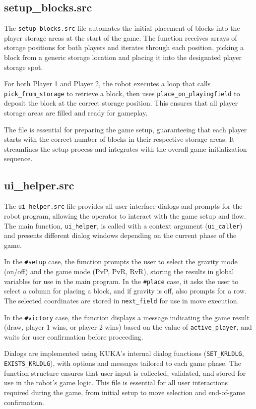 \documentclass{article}
\begin{document}
        \subsection{setup\_blocks.src}
            The \texttt{setup\_blocks.src} file automates the initial placement of blocks into the player storage areas at the start of the game. The function receives arrays of storage positions for both players and iterates through each position, picking a block from a generic storage location and placing it into the designated player storage spot.

            For both Player 1 and Player 2, the robot executes a loop that calls \texttt{pick\_from\_storage} to retrieve a block, then uses \texttt{place\_on\_playingfield} to deposit the block at the correct storage position. This ensures that all player storage areas are filled and ready for gameplay.

            The file is essential for preparing the game setup, guaranteeing that each player starts with the correct number of blocks in their respective storage areas. It streamlines the setup process and integrates with the overall game initialization sequence.

        \subsection{ui\_helper.src}
            The \texttt{ui\_helper.src} file provides all user interface dialogs and prompts for the robot program, allowing the operator to interact with the game setup and flow. The main function, \texttt{ui\_helper}, is called with a context argument (\texttt{ui\_caller}) and presents different dialog windows depending on the current phase of the game.

            In the \texttt{\#setup} case, the function prompts the user to select the gravity mode (on/off) and the game mode (PvP, PvR, RvR), storing the results in global variables for use in the main program. In the \texttt{\#place} case, it asks the user to select a column for placing a block, and if gravity is off, also prompts for a row. The selected coordinates are stored in \texttt{next\_field} for use in move execution.

            In the \texttt{\#victory} case, the function displays a message indicating the game result (draw, player 1 wins, or player 2 wins) based on the value of \texttt{active\_player}, and waits for user confirmation before proceeding.

            Dialogs are implemented using KUKA's internal dialog functions (\texttt{SET\_KRLDLG}, \texttt{EXISTS\_KRLDLG}), with options and messages tailored to each game phase. The function structure ensures that user input is collected, validated, and stored for use in the robot's game logic. This file is essential for all user interactions required during the game, from initial setup to move selection and end-of-game confirmation.
    \newpage
\end{document}
